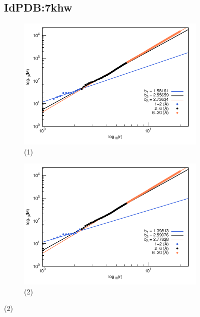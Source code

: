 		
		\begin{figure}[H]
			\subsection*{IdPDB:7khw}
			
			\hspace{-0.3cm} 
			\begin{subfigure}{0.49\textwidth}
				\centering
				\includegraphics[width=\linewidth,page=1]{graphs/PDBs/7khw/7khwaddH.pdf}
				\caption{(1)}
			\end{subfigure}
			\hspace{0.2cm}
			\begin{subfigure}{0.49\textwidth}
				\centering
				\includegraphics[width=\linewidth,page=1]{graphs/PDBs/7khw/7khwEm.pdf}
				\caption{(2)}
			\end{subfigure}
			

\end{figure}

